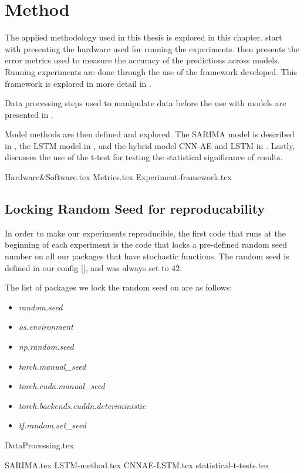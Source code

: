 \chapter{Method}
\label{section:Method}

The applied methodology used in this thesis is explored in this chapter.
 start with presenting the hardware used for running the experiments.
 then presents the error metrics used to measure the accuracy of the predictions across models.
Running experiments are done through the use of the framework developed. This framework is explored in more detail in .

Data processing steps used to manipulate data before the use with models are presented in .

Model methods are then defined and explored. The SARIMA model is described in , the LSTM model in ,
and the hybrid model CNN-AE and LSTM in .
Lastly,  discusses the use of the t-test for testing the statistical significance of results.


{Hardware&Software.tex}
{Metrics.tex}
{Experiment-framework.tex}

\section{Locking Random Seed for reproducability}
In order to make our experiments reproducible, the first code that runs at the beginning of each experiment
is the code that locks a pre-defined random seed number on all our packages that have
stochastic functions.
The random seed is defined in our config [],
and was always set to $42$.

The list of packages we lock the random seed on are as follows:
\begin{itemize}
  \item \textit{random.seed}
  \item \textit{os.environment}
  \item \textit{np.random.seed}
  \item \textit{torch.manual\_seed}
  \item \textit{torch.cuda.manual\_seed}
  \item \textit{torch.backends.cuddn.deteriministic}
  \item \textit{tf.random.set\_seed}
\end{itemize}

{DataProcessing.tex}

{SARIMA.tex}
{LSTM-method.tex}
{CNNAE-LSTM.tex}
{statistical-t-tests.tex}
